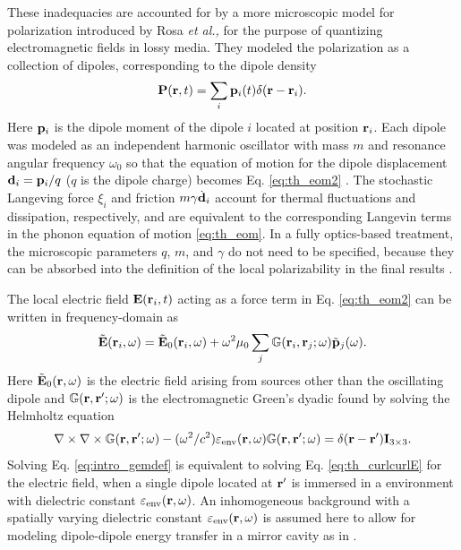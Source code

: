 These inadequacies are accounted for by a more microscopic model for polarization introduced by Rosa \textit{et al.,} \cite{rosa10,rosa11} for the purpose of quantizing electromagnetic fields in lossy media. They modeled the polarization as a collection of dipoles, corresponding to the dipole density
\begin{equation}
 \mathbf{P}(\mathbf{r},t) = \sum_i \mathbf{p}_i(t) \delta(\mathbf{r}-\mathbf{r}_i).
\end{equation}
Here $\mathbf{p}_i$ is the dipole moment of the dipole $i$ located at position $\mathbf{r}_i$. Each dipole was modeled as an independent harmonic oscillator with mass $m$ and resonance angular frequency $\omega_0$ so that the equation of motion for the dipole displacement $\mathbf{d}_i=\mathbf{p}_i/q$ ($q$ is the dipole charge) becomes Eq. \eqref{eq:th_eom2} \cite{rosa10,rosa11}. The stochastic Langeving force $\xi_i$ and friction $m\gamma \dot{\mathbf{d}}_i$ account for thermal fluctuations and dissipation, respectively, and are equivalent to the corresponding Langevin terms in the phonon equation of motion \eqref{eq:th_eom}. In a fully optics-based treatment, the microscopic parameters $q$, $m$, and $\gamma$ do not need to be specified, because they can be absorbed into the definition of the local polarizability in the final results \cite{rosa10}.

The local electric field $\mathbf{E}(\mathbf{r}_i,t)$ acting as a force term in Eq. \eqref{eq:th_eom2} can be written in frequency-domain as \cite{novotny,rosa11}
\begin{equation}
\tilde {\mathbf{E}}(\mathbf{r}_i,\omega) = \tilde {\mathbf{E}}_0(\mathbf{r}_i,\omega) + \omega^2 \mu_0 \sum_j \mathbb{G}(\mathbf{r}_i,\mathbf{r}_j;\omega) \tilde{\mathbf{p}}_j(\omega). \label{eq:th_Etilde}
\end{equation}
Here $\tilde{\mathbf{E}}_0(\mathbf{r},\omega)$ is the electric field arising from sources other than the oscillating dipole and $\mathbb{G}(\mathbf{r},\mathbf{r}';\omega)$ is the electromagnetic Green's dyadic found by solving the Helmholtz equation \cite{novotny}
 \begin{equation}
 \nabla \times \nabla \times \mathbb{G}(\mathbf{r},\mathbf{r}';\omega) - (\omega^2/c^2) \varepsilon_{\textrm{env}}(\mathbf{r},\omega)\mathbb{G}(\mathbf{r},\mathbf{r}';\omega)  =  \delta(\mathbf{r}-\mathbf{r}')\mathbf{I}_{3 \times 3}. \label{eq:intro_gemdef}
\end{equation}
Solving Eq. \eqref{eq:intro_gemdef} is equivalent to solving Eq. \eqref{eq:th_curlcurlE} for the electric field, when a single dipole located at $\mathbf{r}'$ is immersed in a environment with dielectric constant $\varepsilon_{\textrm{env}}(\mathbf{r},\omega)$. An inhomogeneous background with a spatially varying dielectric constant $\varepsilon_{\textrm{env}}(\mathbf{r},\omega)$ is assumed here to allow for modeling dipole-dipole energy transfer in a mirror cavity as in .

